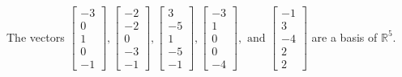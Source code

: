 \begin{exercise}
\begin{exerciseStatement}
  \end{exerciseStatement}
  \begin{exerciseAnswer}
   The vectors \(\left[\begin{array}{r}
-3 \\
0 \\
1 \\
0 \\
-1
\end{array}\right] , \left[\begin{array}{r}
-2 \\
-2 \\
0 \\
-3 \\
-1
\end{array}\right] , \left[\begin{array}{r}
3 \\
-5 \\
1 \\
-5 \\
-1
\end{array}\right] , \left[\begin{array}{r}
-3 \\
1 \\
0 \\
0 \\
-4
\end{array}\right] , \text{ and } \left[\begin{array}{r}
-1 \\
3 \\
-4 \\
2 \\
2
\end{array}\right]\) 
  	 are  a basis of \(\mathbb{R}^5\).
  


  \end{exerciseAnswer}
\end{exercise}